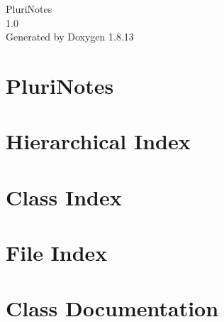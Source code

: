 \documentclass[twoside]{book}
\newcommand{\+}{\discretionary{\mbox{\scriptsize$\hookleftarrow$}}{}{}}
\newcommand{\clearemptydoublepage}{%
  \newpage{\pagestyle{empty}\cleardoublepage}%
}
\begin{document}
\hypersetup{pageanchor=false,
             bookmarksnumbered=true,
             pdfencoding=unicode
            }
\begin{titlepage}
\vspace*{7cm}
\begin{center}%
{\Large Pluri\+Notes \\[1ex]\large 1.\+0 }\\
\vspace*{1cm}
{\large Generated by Doxygen 1.8.13}\\
\end{center}
\end{titlepage}
\clearemptydoublepage
{}
\tableofcontents
\clearemptydoublepage
{}
\hypersetup{pageanchor=true}

\chapter{Pluri\+Notes}
\label{md__r_e_a_d_m_e}

\chapter{Hierarchical Index}

\chapter{Class Index}

\chapter{File Index}

\chapter{Class Documentation}
















































\end{document}
